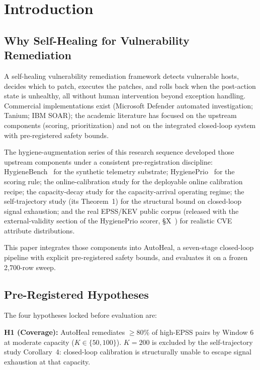 \section{Introduction}

\subsection{Why Self-Healing for Vulnerability Remediation}

A self-healing vulnerability remediation framework detects vulnerable
hosts, decides which to patch, executes the patches, and rolls back
when the post-action state is unhealthy, all without human
intervention beyond exception handling. Commercial implementations
exist (Microsoft Defender automated investigation; Tanium; IBM SOAR);
the academic literature has focused on the upstream components
(scoring, prioritization) and not on the integrated closed-loop
system with pre-registered safety bounds.

The hygiene-augmentation series of this research sequence developed those upstream
components under a consistent pre-registration discipline:
HygieneBench~\cite{paper3hygienebench} for the synthetic
telemetry substrate; HygienePrio~\cite{paper4hygieneprio}
for the scoring rule;
the online-calibration study for the deployable online calibration
recipe; the capacity-decay study for the capacity-arrival
operating regime; the self-trajectory study (its Theorem~1) for the
structural bound on closed-loop signal exhaustion; and the real
EPSS/KEV public corpus (released with the external-validity section
of the HygienePrio scorer, \S X~\cite{paper4hygieneprio})
for realistic CVE attribute distributions.

This paper integrates those components into AutoHeal, a
seven-stage closed-loop pipeline with explicit pre-registered safety
bounds, and evaluates it on a frozen 2{,}700-row sweep.

\subsection{Pre-Registered Hypotheses}

The four hypotheses locked before evaluation are:

\textbf{H1 (Coverage):} AutoHeal remediates $\geq 80\%$ of high-EPSS
pairs by Window 6 at moderate capacity ($K \in \{50, 100\}$).
$K = 200$ is excluded by the self-trajectory study Corollary~4: closed-loop
calibration is structurally unable to escape signal exhaustion at
that capacity.

